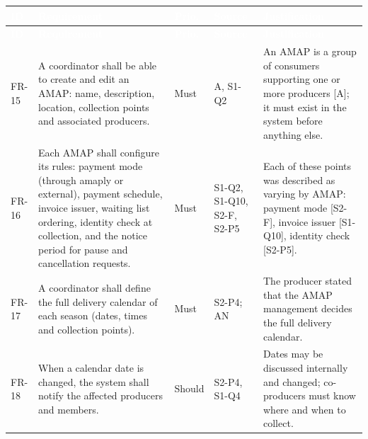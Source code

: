 \documentclass[11pt,a4paper]{article}
\begin{document}
{\footnotesize
\begin{longtable}{>{\raggedright\arraybackslash\hspace{0pt}}p{}>{\raggedright\arraybackslash\hspace{0pt}}p{}>{\raggedright\arraybackslash\hspace{0pt}}p{}>{\raggedright\arraybackslash\hspace{0pt}}p{}>{\raggedright\arraybackslash\hspace{0pt}}p{}}
\rowcolor{hdr}\textcolor{white}{\textbf{ID}} & \textcolor{white}{\textbf{Requirement}} & \textcolor{white}{\textbf{Prio.}} & \textcolor{white}{\textbf{Source}} & \textcolor{white}{\textbf{Justification}} \\ \endfirsthead
\rowcolor{hdr}\textcolor{white}{\textbf{ID}} & \textcolor{white}{\textbf{Requirement}} & \textcolor{white}{\textbf{Prio.}} & \textcolor{white}{\textbf{Source}} & \textcolor{white}{\textbf{Justification}} \\ \endhead
FR-15 & A coordinator shall be able to create and edit an AMAP: name, description, location, collection points and associated producers. & Must & A, S1-Q2 & An AMAP is a group of consumers supporting one or more producers [A]; it must exist in the system before anything else. \\ \hline
FR-16 & Each AMAP shall configure its rules: payment mode (through amaply or external), payment schedule, invoice issuer, waiting list ordering, identity check at collection, and the notice period for pause and cancellation requests. & Must & S1-Q2, S1-Q10, S2-F, S2-P5 & Each of these points was described as varying by AMAP: payment mode [S2-F], invoice issuer [S1-Q10], identity check [S2-P5]. \\ \hline
FR-17 & A coordinator shall define the full delivery calendar of each season (dates, times and collection points). & Must & S2-P4; AN & The producer stated that the AMAP management decides the full delivery calendar. \\ \hline
FR-18 & When a calendar date is changed, the system shall notify the affected producers and members. & Should & S2-P4, S1-Q4 & Dates may be discussed internally and changed; co-producers must know where and when to collect. \\ \hline
\end{longtable}}
\addtocounter{table}{-1}
\end{document}

